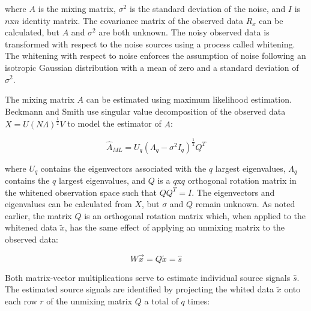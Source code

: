 \noindent where $A$ is the mixing matrix, $\sigma^2$ is the standard deviation of the noise, and $I$ is $n$x$n$ identity matrix. The covariance matrix of the observed data $R_x$ can be calculated, but $A$ and $\sigma^2$ are both unknown. The noisy observed data is transformed with respect to the noise sources using a process called whitening. The whitening with respect to noise enforces the assumption of noise following an isotropic Gaussian distribution with a mean of zero and a standard deviation of $\sigma^2$.

The mixing matrix $A$ can be estimated using maximum likelihood estimation. Beckmann and Smith use singular value decomposition of the observed data $X = U(N\Lambda)^{\frac{1}{2}} V$ to model the estimator of $A$:

\begin{equation}
\hat{A}_{ML} = U_q(\Lambda_q - \sigma ^2 I_q)^{\frac{1}{2}}Q^T
\end{equation}

\noindent where $U_q$ contains the eigenvectors associated with the $q$ largest eigenvalues, $\Lambda_q$ contains the $q$ largest eigenvalues, and $Q$ is a $q$x$q$ orthogonal rotation matrix in the whitened observation space such that $QQ^T = I$. %
The eigenvectors and eigenvalues can be calculated from $X$, but $\sigma$ and $Q$ remain unknown. As noted earlier, the matrix $Q$ is an orthogonal rotation matrix which, when applied to the whitened data $\tilde{x}$, has the same effect of applying an unmixing matrix to the observed data: 

\begin{equation}
\label{ch4:eq:unmixing-01}
W \vec{x} = Q \tilde{x} = \hat{s}
\end{equation}

\noindent Both matrix-vector multiplications serve to estimate individual source signals $\hat{s}$. The estimated source signals are identified by projecting the whited data $\tilde{x}$ onto each row $r$ of the unmixing matrix $Q$ a total of $q$ times:

